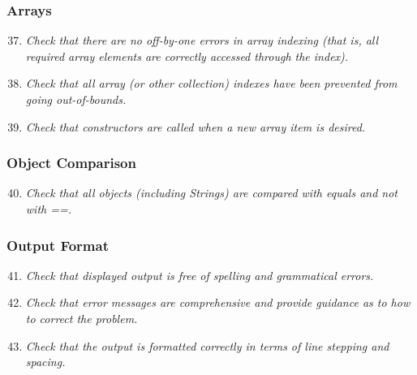 	\subsubsection{Arrays}
		\begin{enumerate}
			\setcounter{enumi}{36}
			\item \textit{Check that there are no off-by-one errors in array indexing (that is, all required array elements are correctly accessed through the index).}\newline

			\item \textit{Check that all array (or other collection) indexes have been prevented from going out-of-bounds.}\newline

			\item \textit{Check that constructors are called when a new array item is desired.}\newline

		\end{enumerate}

	\subsubsection{Object Comparison}
		\begin{enumerate}
			\setcounter{enumi}{39}
			\item \textit{Check that all objects (including Strings) are compared with equals and not with ==.}\newline

		\end{enumerate}

	\subsubsection{Output Format}
		\begin{enumerate}
			\setcounter{enumi}{40}
			\item \textit{Check that displayed output is free of spelling and grammatical errors.}\newline

			\item \textit{Check that error messages are comprehensive and provide guidance as to how to correct the problem.}\newline

			\item \textit{Check that the output is formatted correctly in terms of line stepping and spacing.}\newline

		\end{enumerate}

